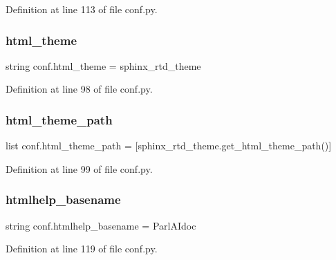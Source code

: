 Definition at line 113 of file conf.\+py.

\mbox{\label{namespaceconf_a6c3bfcc1a44546c1c75ce20f55bd0fd6}} 
\subsubsection{\texorpdfstring{html\+\_\+theme}{html\_theme}}
{\footnotesize\ttfamily string conf.\+html\+\_\+theme = \textquotesingle{}sphinx\+\_\+rtd\+\_\+theme\textquotesingle{}}



Definition at line 98 of file conf.\+py.

\mbox{\label{namespaceconf_a4960231f83b1b44a1ffcd212903b62e8}} 
\subsubsection{\texorpdfstring{html\+\_\+theme\+\_\+path}{html\_theme\_path}}
{\footnotesize\ttfamily list conf.\+html\+\_\+theme\+\_\+path = \mbox{[}sphinx\+\_\+rtd\+\_\+theme.\+get\+\_\+html\+\_\+theme\+\_\+path()\mbox{]}}



Definition at line 99 of file conf.\+py.

\mbox{\label{namespaceconf_aab7fddb2766ce3c430d8246fbfdbc7b1}} 
\subsubsection{\texorpdfstring{htmlhelp\+\_\+basename}{htmlhelp\_basename}}
{\footnotesize\ttfamily string conf.\+htmlhelp\+\_\+basename = \textquotesingle{}Parl\+A\+Idoc\textquotesingle{}}



Definition at line 119 of file conf.\+py.

\mbox{\label{namespaceconf_ad76a2e6d7bfa880ebb4042c08e8b4e12}} 

